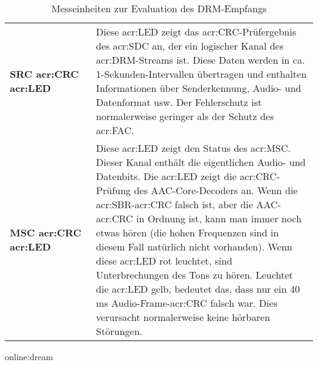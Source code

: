 \begin{table}[h]
\begin{center}
\begin{tabular}{p{0.28\linewidth}  p{0.72\linewidth}}
			\textbf{SRC \gls{acr:CRC} \gls{acr:LED}} & 	Diese \gls{acr:LED} zeigt das \gls{acr:CRC}-Prüfergebnis des \gls{acr:SDC} an, der ein logischer Kanal des \gls{acr:DRM}-Streams ist. Diese Daten werden in ca. 1-Sekunden-Intervallen übertragen und enthalten Informationen über Senderkennung, Audio- und Datenformat usw. Der Fehlerschutz ist normalerweise geringer als der Schutz des \gls{acr:FAC}. \\
			
			\textbf{MSC \gls{acr:CRC} \gls{acr:LED}} & Diese \gls{acr:LED} zeigt den Status des \gls{acr:MSC}. Dieser Kanal enthält die eigentlichen Audio- und Datenbits. Die \gls{acr:LED} zeigt die \gls{acr:CRC}-Prüfung des AAC-Core-Decoders an.  Wenn die \gls{acr:SBR}-\gls{acr:CRC} falsch ist, aber die AAC-\gls{acr:CRC} in Ordnung ist, kann man immer noch etwas hören (die hohen Frequenzen sind in diesem Fall natürlich nicht vorhanden). Wenn diese \gls{acr:LED} rot leuchtet, sind Unterbrechungen des Tons zu hören. Leuchtet die \gls{acr:LED} gelb, bedeutet das, dass nur ein 40 ms Audio-Frame-\gls{acr:CRC} falsch war. Dies verursacht normalerweise keine hörbaren Störungen.\\
			\bottomrule
		\end{tabular}
		\caption{Messeinheiten zur Evaluation des DRM-Empfangs}
		\gls{online:dream}
		\label{tab:drmmess}
	\end{center}
\end{table}


